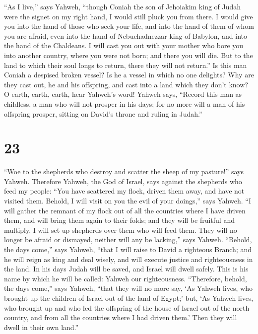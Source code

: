 ``As I live,'' says Yahweh, ``though Coniah the son of
Jehoiakim king of Judah were the signet on my right hand, I would still
pluck you from there.  I would give you into the hand of
those who seek your life, and into the hand of them of whom you are
afraid, even into the hand of Nebuchadnezzar king of Babylon, and into
the hand of the Chaldeans.  I will cast you out with your
mother who bore you into another country, where you were not born; and
there you will die.  But to the land to which their soul
longs to return, there they will not return.''  Is this
man Coniah a despised broken vessel? Is he a vessel in which no one
delights? Why are they cast out, he and his offspring, and cast into a
land which they don't know?  O earth, earth, earth, hear
Yahweh's word!  Yahweh says, ``Record this man as
childless, a man who will not prosper in his days; for no more will a
man of his offspring prosper, sitting on David's throne and ruling in
Judah.''

\hypertarget{section-22}{%
\section{23}\label{section-22}}

 ``Woe to the shepherds who destroy and scatter the sheep
of my pasture!'' says Yahweh.  Therefore Yahweh, the God
of Israel, says against the shepherds who feed my people: ``You have
scattered my flock, driven them away, and have not visited them. Behold,
I will visit on you the evil of your doings,'' says Yahweh.
 ``I will gather the remnant of my flock out of all the
countries where I have driven them, and will bring them again to their
folds; and they will be fruitful and multiply.  I will set
up shepherds over them who will feed them. They will no longer be afraid
or dismayed, neither will any be lacking,'' says Yahweh. 
``Behold, the days come,'' says Yahweh, ``that I will raise to David a
righteous Branch; and he will reign as king and deal wisely, and will
execute justice and righteousness in the land.  In his
days Judah will be saved, and Israel will dwell safely. This is his name
by which he will be called: Yahweh our righteousness. 
``Therefore, behold, the days come,'' says Yahweh, ``that they will no
more say, `As Yahweh lives, who brought up the children of Israel out of
the land of Egypt;'  but, `As Yahweh lives, who brought up
and who led the offspring of the house of Israel out of the north
country, and from all the countries where I had driven them.' Then they
will dwell in their own land.''

